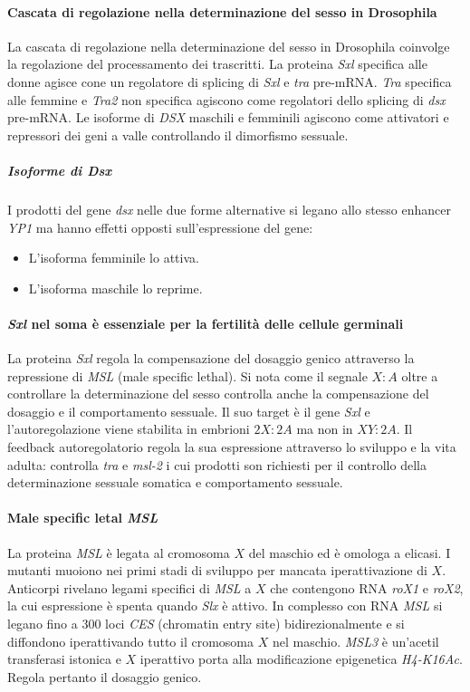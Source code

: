 			\paragraph{Cascata di regolazione nella determinazione del sesso in Drosophila}
			La cascata di regolazione nella determinazione del sesso in Drosophila coinvolge la regolazione del processamento dei trascritti.
			La proteina \emph{Sxl} specifica alle donne agisce cone un regolatore di splicing di \emph{Sxl} e \emph{tra} pre-mRNA.
			\emph{Tra} specifica alle femmine e \emph{Tra2} non specifica agiscono come regolatori dello splicing di \emph{dsx} pre-mRNA.
			Le isoforme di \emph{DSX} maschili e femminili agiscono come attivatori e repressori dei geni a valle controllando il dimorfismo sessuale.

				\subparagraph{Isoforme di \emph{Dsx}}
				I prodotti del gene \emph{dsx} nelle due forme alternative si legano allo stesso enhancer \emph{YP1} ma hanno effetti opposti sull'espressione del gene:
				\begin{itemize}
					\item L'isoforma femminile lo attiva.
					\item L'isoforma maschile lo reprime.
				\end{itemize}

			\paragraph{\emph{Sxl} nel soma \`e essenziale per la fertilit\`a delle cellule germinali}
			La proteina \emph{Sxl} regola la compensazione del dosaggio genico attraverso la repressione di \emph{MSL} (male specific lethal).
			Si nota come il segnale $X:A$ oltre a controllare la determinazione del sesso controlla anche la compensazione del dosaggio e il comportamento sessuale.
			Il suo target \`e il gene \emph{Sxl} e l'autoregolazione viene stabilita in embrioni $2X:2A$ ma non in $XY:2A$.
			Il feedback autoregolatorio regola la sua espressione attraverso lo sviluppo e la vita adulta: controlla \emph{tra} e \emph{msl-2} i cui prodotti son richiesti per il controllo della determinazione sessuale somatica e comportamento sessuale.

			\paragraph{Male specific letal \emph{MSL}}
			La proteina \emph{MSL} \`e legata al cromosoma $X$ del maschio ed \`e omologa a elicasi.
			I mutanti muoiono nei primi stadi di sviluppo per mancata iperattivazione di $X$.
			Anticorpi rivelano legami specifici di \emph{MSL} a $X$ che contengono RNA \emph{roX1} e \emph{roX2}, la cui espressione \`e spenta quando \emph{Slx} \`e attivo.
			In complesso con RNA \emph{MSL} si legano fino a $300$ loci \emph{CES} (chromatin entry site) bidirezionalmente e si diffondono iperattivando tutto il cromosoma $X$ nel maschio.
			\emph{MSL3} \`e un'acetil transferasi istonica e $X$ iperattivo porta alla modificazione epigenetica \emph{H4-K16Ac}.
			Regola pertanto il dosaggio genico.

